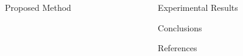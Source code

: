 \documentclass[final]{beamer}
\newlength{\sepwidth}
\newlength{\colwidth}
\newcommand{\separatorcolumn}{\begin{column}{\sepwidth}\end{column}}
\begin{document}
\begin{frame}[t]
\begin{columns}[t]
\begin{column}{\colwidth}
\begin{block}{Proposed Method}
  \end{block}

  
\end{column}




\separatorcolumn





\begin{column}{\colwidth}

    \begin{block}{Experimental Results}

    \lipsum[2-4]
  
    \end{block}


  \begin{block}{Conclusions}

    \lipsum[2-3]

 \end{block}


  \begin{block}{References}

    \footnotesize{}
  \end{block}

 

\end{column}


\separatorcolumn
\end{columns}
\end{frame}
\end{document}
